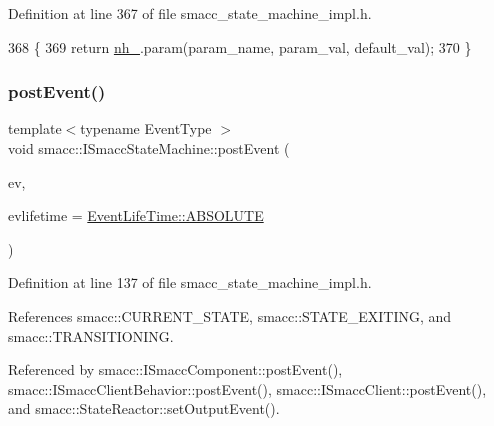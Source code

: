 Definition at line 367 of file smacc\+\_\+state\+\_\+machine\+\_\+impl.\+h.


\begin{DoxyCode}
368   \{
369     \textcolor{keywordflow}{return} \hyperlink{classsmacc_1_1ISmaccStateMachine_ad8877bcca9dbb345fe72cca839c93dd3}{nh\_}.param(param\_name, param\_val, default\_val);
370   \}
\end{DoxyCode}
\mbox{\label{classsmacc_1_1ISmaccStateMachine_afcb6a216441aeaea2cba4e1ab12c366b}} 
\subsubsection{\texorpdfstring{post\+Event()}{postEvent()}\hspace{0.1cm}{\footnotesize\ttfamily [1/2]}}
{\footnotesize\ttfamily template$<$typename Event\+Type $>$ \\
void smacc\+::\+I\+Smacc\+State\+Machine\+::post\+Event (\begin{DoxyParamCaption}\item[{Event\+Type $\ast$}]{ev,  }\item[{\hyperlink{namespacesmacc_a5063f47926ad2fe25120ed4b1e7b2c7e}{Event\+Life\+Time}}]{evlifetime = {\ttfamily \hyperlink{namespacesmacc_a5063f47926ad2fe25120ed4b1e7b2c7ea3a0bc063b6db8cae0361657958be836f}{Event\+Life\+Time\+::\+A\+B\+S\+O\+L\+U\+TE}} }\end{DoxyParamCaption})}



Definition at line 137 of file smacc\+\_\+state\+\_\+machine\+\_\+impl.\+h.



References smacc\+::\+C\+U\+R\+R\+E\+N\+T\+\_\+\+S\+T\+A\+TE, smacc\+::\+S\+T\+A\+T\+E\+\_\+\+E\+X\+I\+T\+I\+NG, and smacc\+::\+T\+R\+A\+N\+S\+I\+T\+I\+O\+N\+I\+NG.



Referenced by smacc\+::\+I\+Smacc\+Component\+::post\+Event(), smacc\+::\+I\+Smacc\+Client\+Behavior\+::post\+Event(), smacc\+::\+I\+Smacc\+Client\+::post\+Event(), and smacc\+::\+State\+Reactor\+::set\+Output\+Event().


